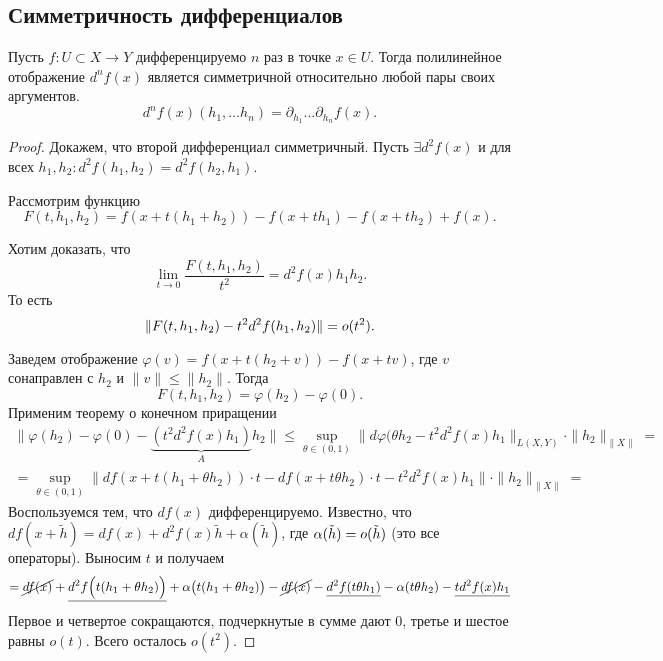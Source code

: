 \subsection{Симметричность дифференциалов}
\begin{thm}
    Пусть $ f\colon U \subset X \to  Y$ дифференцируемо $ n$ раз  в точке  $ x \in U$.
	Тогда полилинейное отображение $ d^{n}f(x)$ является симметричной относительно любой пары своих аргументов.
	\[
		d^{n}f(x) (h_1, \ldots h_n) = \partial _{h_1} \ldots \partial _{h_n}f(x)
	.\] 
\end{thm}
\begin{proof}
    Докажем, что второй дифференциал симметричный.
	Пусть $ \exists d^{2}f(x)$ и для всех $ h_1, h_2\colon d^2f(h_1, h_2) = d^2f(h_2, h_1)$.  

	Рассмотрим функцию 
	 \[
		 F(t, h_1, h_2) = f( x+t(h_1+h_2)) - f(x+th_1) - f(x+th_2) + f(x)
	.\] 
\begin{figure}[ht]
    \centering
    \caption{}
    \label{fig:symmetric-diff}
\end{figure}
    Хотим доказать, что
    \[
	\lim_{t \to  0}\frac{F(t, h_1, h_2 )}{t^2} = d^2f(x) h_1 h_2
    .\] 
    То есть
    \[
	\| F(t, h_1, h_2) - t^2 d^2f(h_1, h_2) \| = o(t^2) 
    .\] 

    Заведем отображение 
    $ \varphi (v) = f(x+ t(h_2 + v)) - f(x+tv)$, где $ v$ сонаправлен с  $ h_2$ и $ \| v \| \le  \| h_2 \| $.
	Тогда
    \[
	F(t, h_1, h_2) = \varphi (h_2) - \varphi (0)
    .\] 
Применим теорему о конечном приращении
\begin{align*}
    \|  \varphi (h_2) - \varphi (0) - \underbrace{(t^2 d^2f(x)h_1)}_{A}h_2 \| 
	\le \sup_{\theta \in (0, 1)}  \| d \varphi  (\theta h_2 - t^2 d^2f(x)h_1 \|_{L(X, Y)}  \cdot \| h_2 \|_{\| X \| }  = \\
    = \sup_{\theta \in (0, 1)} \| df(x + t(h_1 + \theta h_2)) \cdot  t  - df(x + t \theta h_2)\cdot t -t^2d^2f(x)h_1\| \cdot \| h_2 \| _{\| X \| }  =
\end{align*}
Воспользуемся тем, что $ df(x)$ дифференцируемо.
Известно, что $ df(x + \tilde h) = df(x) + d^2f(x) \tilde h + \alpha (\tilde h)$, где $ \alpha (\tilde h) = o(\tilde h)$ (это все операторы).
 Выносим $ t$ и получаем
\[
	= \cancel {df(x)} + \underline{d^2f \Bigl(t (h_1 + \theta h_2)\Bigr)} + \alpha \bigl(t(h_1+ \theta h_2)\bigr) - \cancel{df(x)} - \underline{d^2f(t \theta h_1)} - \alpha (t\theta h_2) - \underline{td^2f(x)h_1}
\] 
Первое и четвертое сокращаются, подчеркнутые в сумме дают 0, третье и шестое равны $ o(t)$.
Всего осталось  $ o(t^2)$.
\end{proof}


